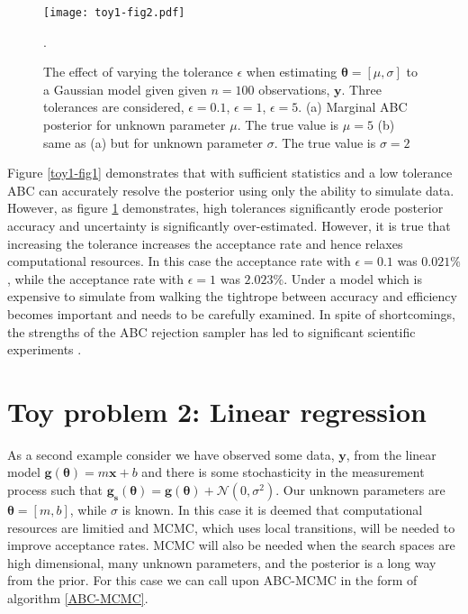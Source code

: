 \begin{figure}[H]
	\centering
	\texttt{[image: toy1-fig2.pdf]}
	\caption{The effect of varying the tolerance $\epsilon$ when estimating $\bm{\theta} = [\mu,\sigma]$ to a Gaussian model given given $n = 100$ observations, $\bm{y}$. Three tolerances are considered, $\epsilon = 0.1$, $\epsilon = 1$, $\epsilon = 5$. (a) Marginal ABC posterior for unknown parameter $\mu$. The true value is $\mu = 5$ (b) same as (a) but for unknown parameter $\sigma$. The true value is $\sigma = 2$}.
	\label{toy1-fig2}
\end{figure}

Figure \ref{toy1-fig1} demonstrates that with sufficient statistics and a low tolerance ABC can accurately resolve the posterior using only the ability to simulate data. However, as figure \ref{toy1-fig2} demonstrates, high tolerances significantly erode posterior accuracy and uncertainty is significantly over-estimated. However, it is true that increasing the tolerance increases the acceptance rate and hence relaxes computational resources. In this case the acceptance rate with $\epsilon = 0.1$ was $0.021\%$, while the acceptance rate with $\epsilon = 1$ was $2.023\%$. Under a model which is expensive to simulate from walking the tightrope between accuracy and efficiency becomes important and needs to be carefully examined. In spite of shortcomings, the strengths of the ABC rejection sampler has led to significant scientific experiments \citep{Fu1997,Weiss1998a,Pritchard1999a}.

\section{Toy problem 2: Linear regression}
\label{sec-lin-reg}

As a second example consider we have observed some data, $\bm{y}$, from the linear model $\bm{g}(\bm{\theta}) = m\bm{x} + b$ and there is some stochasticity in the measurement process such that $\bm{g_s}(\bm{\theta}) = \bm{g}(\bm{\theta}) + \mathcal{N}(0,\sigma^2)$. Our unknown parameters are $\bm{\theta} = [m,b]$, while $\sigma$ is known. In this case it is deemed that computational resources are limitied and MCMC, which uses local transitions, will be needed to improve acceptance rates. MCMC will also be needed when the search spaces are high dimensional, many unknown parameters, and the posterior is a long way from the prior. For this case we can call upon ABC-MCMC in the form of algorithm \ref{ABC-MCMC}. \\

